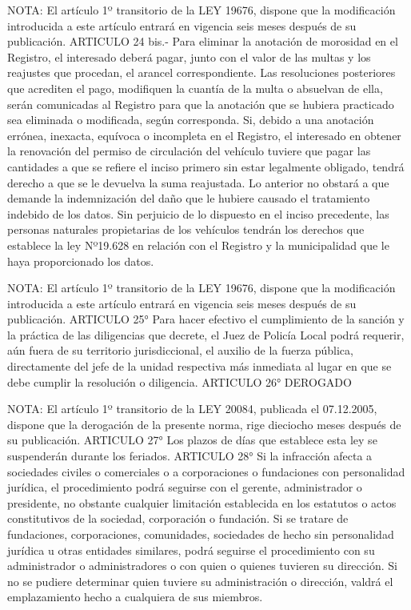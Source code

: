 NOTA:
    El artículo 1º transitorio de la LEY 19676, dispone que la modificación introducida a este artículo entrará en vigencia seis meses después de su publicación.
    ARTICULO 24 bis.- Para eliminar la anotación de morosidad en el Registro, el interesado deberá pagar, junto con el valor de las multas y los reajustes que procedan, el arancel correspondiente.
    Las resoluciones posteriores que acrediten el pago, modifiquen la cuantía de la multa o absuelvan de ella, serán comunicadas al Registro para que la anotación que se hubiera practicado sea eliminada o modificada, según corresponda.
    Si, debido a una anotación errónea, inexacta, equívoca o incompleta en el Registro, el interesado en obtener la renovación del permiso de circulación del vehículo tuviere que pagar las cantidades a que se refiere el inciso primero sin estar legalmente obligado, tendrá derecho a que se le devuelva la suma reajustada. Lo anterior no obstará a que demande la indemnización del daño que le hubiere causado el tratamiento indebido de los datos.
    Sin perjuicio de lo dispuesto en el inciso precedente, las personas naturales propietarias de los vehículos tendrán los derechos que establece la ley Nº19.628 en relación con el Registro y la municipalidad que le haya proporcionado los datos.

NOTA:
    El artículo 1º transitorio de la LEY 19676, dispone que la modificación introducida a este artículo entrará en vigencia seis meses después de su publicación.
    ARTICULO 25° Para hacer efectivo el cumplimiento de la sanción y la práctica de las diligencias que decrete, el Juez de Policía Local podrá requerir, aún fuera de su territorio jurisdiccional, el auxilio de la fuerza pública, directamente del jefe de la unidad respectiva más inmediata al lugar en que se debe cumplir la resolución o diligencia.
    ARTICULO 26° DEROGADO

NOTA:
      El artículo 1º transitorio de la LEY 20084, publicada el 07.12.2005, dispone que la derogación de la presente norma, rige dieciocho meses después de su publicación.
    ARTICULO 27° Los plazos de días que establece esta ley se suspenderán durante los feriados.
    ARTICULO 28° Si la infracción afecta a sociedades civiles o comerciales o a corporaciones o fundaciones con personalidad jurídica, el procedimiento podrá seguirse con el gerente, administrador o presidente, no obstante cualquier limitación establecida en los estatutos o actos constitutivos de la sociedad, corporación o fundación.
    Si se tratare de fundaciones, corporaciones, comunidades, sociedades de hecho sin personalidad jurídica u otras entidades similares, podrá seguirse el procedimiento con su administrador o administradores o con quien o quienes tuvieren su dirección. Si no se pudiere determinar quien tuviere su administración o dirección, valdrá el emplazamiento hecho a cualquiera de sus miembros.

